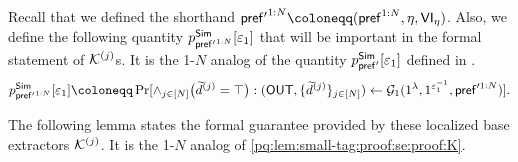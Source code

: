 Recall that we defined the shorthand $\msf{pref'}^{1:N} \coloneqq (\msf{pref}^{1:N},\eta,\msf{VI}_{\eta})$. Also, we define the following quantity $p^{\mathsf{Sim}}_{\mathsf{pref'}^{1:N}}[\varepsilon_1]$ that will be important in the formal statement of $\mathcal{K}^{(j)}$s. It is the 1-$N$ analog of the quantity $p^{\mathsf{Sim}}_{\mathsf{pref}'}[\varepsilon_1]$ defined in . 
\begin{equation}\label{eq:def:p-pref:1-many}
p^{\msf{Sim}}_{\msf{pref'}^{1:N}}[\epsilon_1] \coloneqq \Pr[\wedge_{j \in [N]} \big(\tilde{d}^{(j)} = \top \big) : (\OUT,\Set{\tilde{d}^{(j)}}_{j \in [N]}) \gets \mcal{G}_1(1^\secpar, 1^{\epsilon_1^{-1}}, \msf{pref}'^{1:N})].
\end{equation}






The following lemma states the formal guarantee provided by these localized base extractors $\mathcal{K}^{(j)}$. It is the 1-$N$ analog of \cref{pq:lem:small-tag:proof:se:proof:K}.  

